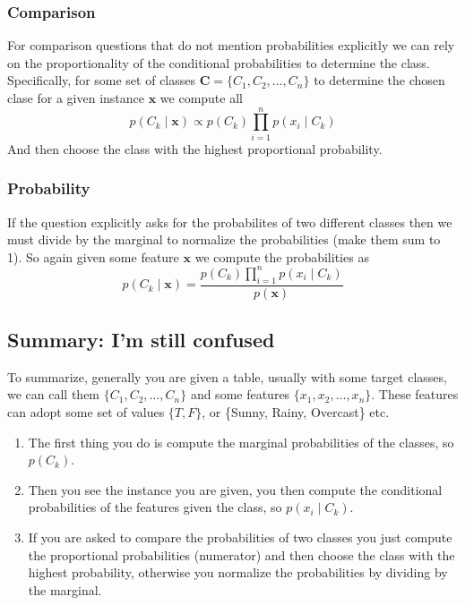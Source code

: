 \documentclass[12pt]{article}
\begin{document}
\subsubsection*{Comparison}

For comparison questions that do not mention probabilities explicitly we can rely on the proportionality of the conditional probabilities to determine the class. Specifically, for some set of classes $\mathbf C = \{C_1, C_2, \ldots, C_n\}$ to determine the chosen clase for a given instance $\mathbf x$ we compute all 
\[
    p(C_k\mid \mathbf x) \propto p(C_k)\prod_{i=1}^{n}p(x_i\mid C_k)    
\]
And then choose the class with the highest proportional probability.

\subsubsection*{Probability}

If the question explicitly asks for the probabilites of two different classes then we must divide by the marginal to normalize the probabilities (make them sum to 1). So again given some feature $\mathbf x$ we compute the probabilities as
\[
    p(C_k\mid \mathbf x) = \frac{p(C_k)\prod_{i=1}^{n}p(x_i\mid C_k)}{p(\mathbf x)}    
\]

\subsection{Summary: I'm still confused}
To summarize, generally you are given a table, usually with some target classes, we can call them $\{C_1, C_2, \ldots, C_n\}$ and some features $\{x_1, x_2, \ldots, x_n\}$. These features can adopt some set of values $\{T, F\}$, or \{Sunny, Rainy, Overcast\} etc. 
\begin{enumerate}[leftmargin=*, noitemsep]
    \item The first thing you do is compute the marginal probabilities of the classes, so $p(C_k)$.
    \item Then you see the instance you are given, you then compute the conditional probabilities of the features given the class, so $p(x_i\mid C_k)$.
    \item If you are asked to compare the probabilities of two classes you just compute the proportional probabilities (numerator) and then choose the class with the highest probability, otherwise you normalize the probabilities by dividing by the marginal. 
\end{enumerate}
\end{document}
